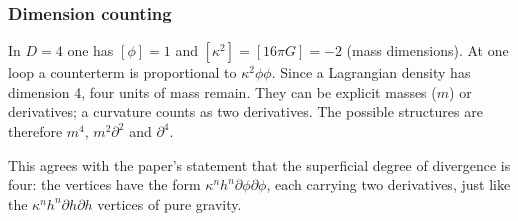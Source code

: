 \subsubsection{Dimension counting}
\tD{}
In $D=4$ one has $[\phi]=1$ and $[\kappa^2]=[16\pi G]=-2$ (mass dimensions).
At one loop a counterterm is proportional to $\kappa^2\phi\phi$.
Since a Lagrangian density has dimension 4, four units of mass remain.
They can be explicit masses ($m$) or derivatives; a curvature counts as two derivatives.
The possible structures are therefore $m^4$, $m^2\partial^2$ and $\partial^4$.

This agrees with the paper's statement that the superficial degree of divergence is four:
the vertices have the form $\kappa^nh^n\partial\phi\partial\phi$, each carrying two derivatives, just like the $\kappa^nh^n\partial h\partial h$ vertices of pure gravity.

